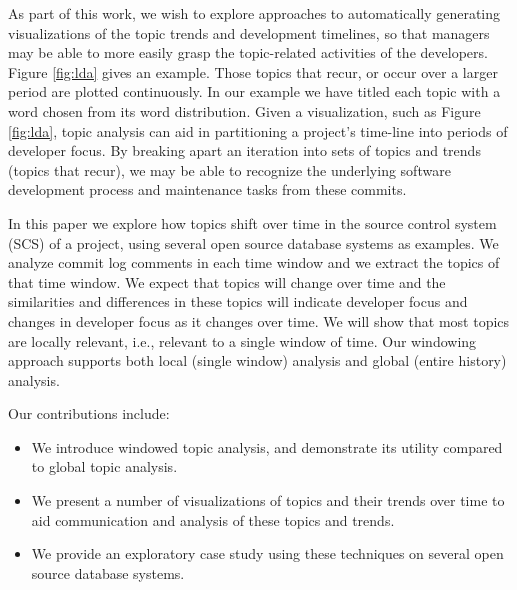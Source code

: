 \documentclass[times, 10pt,twocolumn]{article}
\begin{document}


As part of this work, we wish to explore approaches to automatically
generating visualizations of the topic trends and development timelines, so
that managers may be able to more easily grasp the topic-related
activities of the developers.  Figure \ref{fig:lda} gives an example.
Those topics that
recur, or occur over a larger period are plotted continuously. In our
example we have titled each topic with a word chosen from its
word distribution.  
Given a visualization, such as Figure \ref{fig:lda}, topic
analysis can aid in partitioning a project's time-line into periods of
developer focus.
By breaking apart an iteration into sets of topics
and trends (topics that recur), we may be able to recognize the
underlying software development process and maintenance tasks from these
commits. 




In this paper we explore how topics shift over time in the source
control system (SCS) of a project, using several open source database
systems as examples. We analyze commit log comments in each time
window and we extract the topics of that time window. We expect that
topics will change over time and the similarities and differences in
these topics will indicate developer focus and changes in developer
focus as it changes over time. We will show that most topics are
locally relevant, i.e., relevant to a single window of time.  
Our windowing approach supports both local (single window) analysis
and global (entire history) analysis.


Our contributions include:
\begin{itemize}

\item  We introduce windowed topic analysis, and demonstrate its utility
  compared to global topic analysis.

\item We present a number of visualizations of topics and their trends over time to aid
  communication and analysis of these topics and trends.
\item We provide an exploratory case study using these techniques on
  several open source database systems.
\end{itemize}
\end{document}
